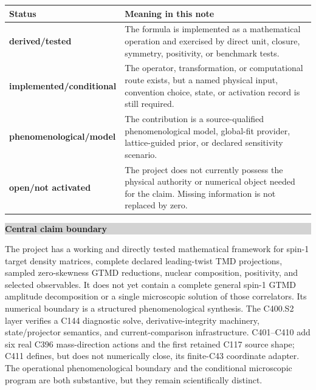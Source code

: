 \documentclass[11pt,oneside]{book}
\newcommand{\statusderived}{\textcolor{derivedgreen}{\textbf{derived/tested}}}
\newcommand{\statusconditional}{\textcolor{conditionalorange}{\textbf{implemented/conditional}}}
\newcommand{\statusmodel}{\textcolor{modelblue}{\textbf{phenomenological/model}}}
\newcommand{\statusopen}{\textcolor{warningred}{\textbf{open/not activated}}}
\newenvironment{claimbox}[1]{%
  \begin{center}\begin{minipage}{0.94\textwidth}
  \colorbox{lightgray}{\parbox{0.96\textwidth}{\textbf{#1}}}\smallskip\par
}{%
  \end{minipage}\end{center}
}
\begin{document}
\begin{longtable}{@{}p{}p{}@{}}
\toprule
\textbf{Status} & \textbf{Meaning in this note}\\
\midrule
\statusderived & The formula is implemented as a mathematical operation and exercised by direct unit, closure, symmetry, positivity, or benchmark tests.\\
\statusconditional & The operator, transformation, or computational route exists, but a named physical input, convention choice, state, or activation record is still required.\\
\statusmodel & The contribution is a source-qualified phenomenological model, global-fit provider, lattice-guided prior, or declared sensitivity scenario.\\
\statusopen & The project does not currently possess the physical authority or numerical object needed for the claim.  Missing information is not replaced by zero.\\
\bottomrule
\end{longtable}

\begin{claimbox}{Central claim boundary}
The project has a working and directly tested mathematical framework for spin-1 target density matrices, complete declared leading-twist TMD projections, sampled zero-skewness GTMD reductions, nuclear composition, positivity, and selected observables.  It does not yet contain a complete general spin-1 GTMD amplitude decomposition or a single microscopic solution of those correlators.  Its numerical boundary is a structured phenomenological synthesis.  The C400.S2 layer verifies a C144 diagnostic solve, derivative-integrity machinery, state/projector semantics, and current-comparison infrastructure.  C401--C410 add six real C396 mass-direction actions and the first retained C117 source shape; C411 defines, but does not numerically close, its finite-C43 coordinate adapter.  The operational phenomenological boundary and the conditional microscopic program are both substantive, but they remain scientifically distinct.
\end{claimbox}
\end{document}
